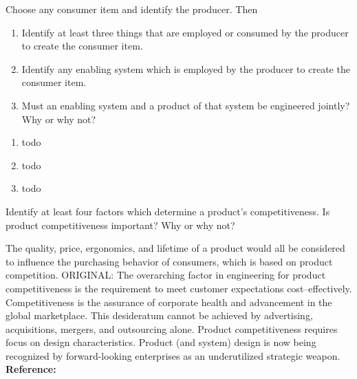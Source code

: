 \begin{exercises}
    \begin{exercise}
    \label{sea-02-07_08}
        Choose any consumer item and identify the producer. Then
        \begin{enumerate}[label=\alph*)]
            \item Identify at least three things that are employed or consumed by the producer to create the consumer item.
            \item Identify any enabling system which is employed by the producer to create the consumer item.
            \item Must an enabling system and a product of that system be engineered jointly? Why or why not?
        \end{enumerate}
    \end{exercise}
    \begin{solution}
        \begin{enumerate}[label=\alph*)]
            \item todo
            \item todo
            \item todo
        \end{enumerate}
    \end{solution}
    
    \begin{exercise} 
    \label{sea-02-09}
        Identify at least four factors which determine a product's competitiveness. Is product competitiveness important? Why or why not?
    \end{exercise}
    \begin{solution}
        The quality, price, ergonomics, and lifetime of a product would all be considered to influence the purchasing behavior of consumers, which is based on product competition. ORIGINAL: The overarching factor in engineering for product competitiveness is the requirement to meet customer expectations cost–effectively. Competitiveness is the assurance of corporate health and advancement in the global marketplace. This desideratum cannot be achieved by advertising, acquisitions, mergers, and outsourcing alone. Product competitiveness requires focus on design characteristics. Product (and system) design is now being recognized by forward-looking enterprises as an underutilized strategic weapon. \textbf{Reference:}
    \end{solution}
    

\end{exercises}
